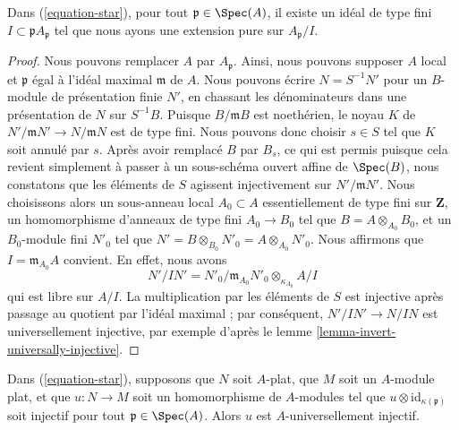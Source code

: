 \begin{lemma}
\label{lemma-find-pure-spreadout}
Dans (\ref{equation-star}), pour tout $\mathfrak p \in \Spec(A)$,
il existe un idéal de type fini $I \subset \mathfrak pA_\mathfrak p$
tel que nous ayons une extension pure sur $A_\mathfrak p/I$.
\end{lemma}

\begin{proof}
Nous pouvons remplacer $A$ par $A_\mathfrak p$. Ainsi, nous pouvons supposer $A$
local et $\mathfrak p$ égal à l'idéal maximal $\mathfrak m$ de $A$.
Nous pouvons écrire $N = S^{-1}N'$ pour un $B$-module de présentation finie $N'$,
en chassant les dénominateurs dans une présentation de $N$ sur $S^{-1}B$.
Puisque $B/\mathfrak m B$ est noethérien, le noyau $K$ de
$N'/\mathfrak m N' \to N/\mathfrak m N$ est de type fini.
Nous pouvons donc choisir $s \in S$ tel que $K$ soit annulé par $s$.
Après avoir remplacé $B$ par $B_s$, ce qui est permis puisque cela revient simplement à passer
à un sous-schéma ouvert affine de $\Spec(B)$, nous constatons que les éléments de $S$
agissent injectivement sur $N'/\mathfrak m N'$. Nous choisissons alors
un sous-anneau local $A_0 \subset A$ essentiellement de type fini sur $\mathbf{Z}$,
un homomorphisme d'anneaux de type fini $A_0 \to B_0$ tel que $B = A \otimes_{A_0} B_0$,
et un $B_0$-module fini $N'_0$ tel que
$N' = B \otimes_{B_0} N'_0 = A \otimes_{A_0} N'_0$.
Nous affirmons que $I = \mathfrak m_{A_0} A$ convient.
En effet, nous avons
$$
N'/IN' = N'_0/\mathfrak m_{A_0} N'_0 \otimes_{\kappa_{A_0}} A/I
$$
qui est libre sur $A/I$. La multiplication par les éléments de $S$
est injective après passage au quotient par l'idéal maximal ; par conséquent,
$N'/IN' \to N/IN$ est universellement injective, par exemple d'après le
lemme \ref{lemma-invert-universally-injective}.
\end{proof}

\begin{lemma}
\label{lemma-universally-injective-if-flat}
Dans (\ref{equation-star}), supposons que $N$ soit $A$-plat, que $M$ soit un $A$-module plat,
et que $u : N \to M$ soit un homomorphisme de $A$-modules tel que
$u \otimes \text{id}_{\kappa(\mathfrak p)}$ soit injectif pour tout
$\mathfrak p \in \Spec(A)$. Alors $u$ est $A$-universellement injectif.
\end{lemma}

